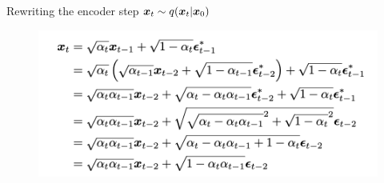 \begin{frame}{Rewriting the encoder step $\boldsymbol{x}_{t} \sim q(\boldsymbol{x}_{t}|\boldsymbol{x}_0)$}
  \begin{figure}
    \centering
    \includegraphics[width=0.8\linewidth]{images/encoder_step1.png}
  \end{figure}
\end{frame}